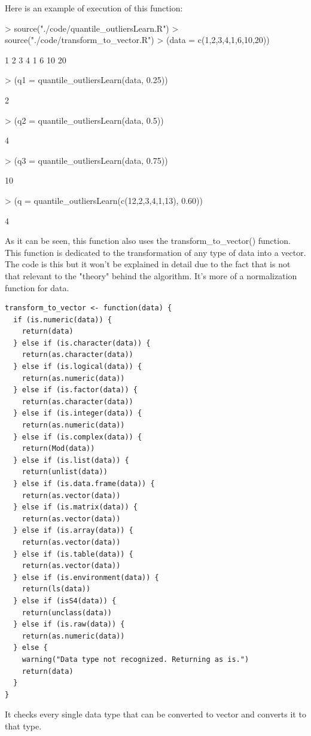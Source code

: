 \documentclass{article}
\begin{document}
Here is an example of execution of this function:
\begin{Schunk}
\begin{Sinput}
> source("./code/quantile_outliersLearn.R")
> source("./code/transform_to_vector.R")
> (data = c(1,2,3,4,1,6,10,20))
\end{Sinput}
\begin{Soutput}
[1]  1  2  3  4  1  6 10 20
\end{Soutput}
\begin{Sinput}
> (q1 = quantile_outliersLearn(data, 0.25))
\end{Sinput}
\begin{Soutput}
[1] 2
\end{Soutput}
\begin{Sinput}
> (q2 = quantile_outliersLearn(data, 0.5))
\end{Sinput}
\begin{Soutput}
[1] 4
\end{Soutput}
\begin{Sinput}
> (q3 = quantile_outliersLearn(data, 0.75))
\end{Sinput}
\begin{Soutput}
[1] 10
\end{Soutput}
\begin{Sinput}
> (q = quantile_outliersLearn(c(12,2,3,4,1,13), 0.60))
\end{Sinput}
\begin{Soutput}
[1] 4
\end{Soutput}
\end{Schunk}
As it can be seen, this function also uses the transform\_to\_vector() function. This function is dedicated to the transformation of any type of data into a vector. The code is this but it won't be explained in detail due to the fact that is not that relevant to the "theory" behind the algorithm. It's more of a normalization function for data.
\begin{lstlisting}[style=RStyle, caption="transform\_to\_vector code"]
transform_to_vector <- function(data) {
  if (is.numeric(data)) {
    return(data)
  } else if (is.character(data)) {
    return(as.character(data))
  } else if (is.logical(data)) {
    return(as.numeric(data))
  } else if (is.factor(data)) {
    return(as.character(data))
  } else if (is.integer(data)) {
    return(as.numeric(data))
  } else if (is.complex(data)) {
    return(Mod(data))
  } else if (is.list(data)) {
    return(unlist(data))
  } else if (is.data.frame(data)) {
    return(as.vector(data))
  } else if (is.matrix(data)) {
    return(as.vector(data))
  } else if (is.array(data)) {
    return(as.vector(data))
  } else if (is.table(data)) {
    return(as.vector(data))
  } else if (is.environment(data)) {
    return(ls(data))
  } else if (isS4(data)) {
    return(unclass(data))
  } else if (is.raw(data)) {
    return(as.numeric(data))
  } else {
    warning("Data type not recognized. Returning as is.")
    return(data)
  }
}
\end{lstlisting}
It checks every single data type that can be converted to vector and converts it to that type.
\end{document}
